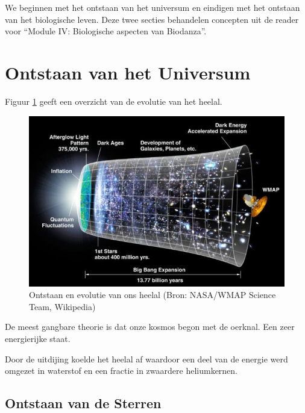 \documentclass[
  11pt,
]{book}
\begin{document}
We beginnen met het ontstaan van het universum en eindigen met het ontstaan van het biologische leven. Deze twee secties behandelen concepten uit de reader voor ``Module IV: Biologische aspecten van Biodanza''.

\hypertarget{ontstaan-van-het-universum}{%
\section{Ontstaan van het Universum}\label{ontstaan-van-het-universum}}

Figuur \ref{fig:evolutionUniverse} geeft een overzicht van de evolutie van het heelal.

\begin{figure}

{\centering \includegraphics[width=1\linewidth]{./figs/originKosmos} 

}

\caption{Ontstaan ​​en evolutie van ons heelal (Bron: NASA/WMAP Science Team, Wikipedia)}\label{fig:evolutionUniverse}
\end{figure}

De meest gangbare theorie is dat onze kosmos begon met de oerknal. Een zeer energierijke staat.

Door de uitdijing koelde het heelal af waardoor een deel van de energie werd omgezet in waterstof en een fractie in zwaardere heliumkernen.

\hypertarget{ontstaan-van-de-sterren}{%
\subsection{Ontstaan van de Sterren}\label{ontstaan-van-de-sterren}}
\end{document}
